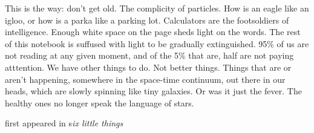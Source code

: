 This is the way: don't get old. The complicity of particles. How is an
eagle like an igloo, or how is a parka like a parking lot. Calculators
are the footsoldiers of intelligence. Enough white space on the page
sheds light on the words. The rest of this notebook is suffused with
light to be gradually extinguished. 95\% of us are not reading at any
given moment, and of the 5\% that are, half are not paying atttention.
We have other things to do. Not better things. Things that are or aren't
happening, somewhere in the space-time continuum, out there in our
heads, which are slowly spinning like tiny galaxies. Or was it just the
fever. The healthy ones no longer speak the language of stars.

first appeared in s\emph{ix little things}
